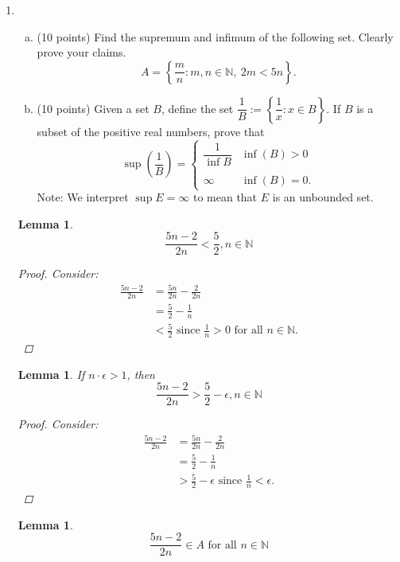 \documentclass{amsart}
\newtheorem{lemma}[theorem]{Lemma}
\begin{document}
\begin{enumerate}[1.]
\item  \begin{enumerate}[(a)]
	\item (10 points) Find the supremum and infimum of the following set.
	Clearly prove your claims.
	\[ A = \left\{ \frac{m}{n} : m,n \in \mathbb N,\ 2m<5n \right\}. \]
	\item (10 points) Given a set $B$, define the set $\dfrac{1}{B} := \left\{\dfrac{1}{x} : x \in B \right\}$. If $B$ is a subset of the positive real numbers, prove that
	\[ \sup \left(\frac{1}{B} \right) = \begin{cases}
                                            \dfrac{1}{\inf B} & \inf(B) > 0 \\
	                                                          & \\
	                                        \infty            & \inf(B) = 0.
	\end{cases}
	\]
Note: We interpret $\sup E = \infty$ to mean that $E$ is an unbounded set.
\end{enumerate}
\begin{lemma}
	\[
		\frac{5n - 2}{2n} < \frac{5}{2}, n \in \mathbb{N}	
	\]
	\begin{proof}
		Consider:
		\begin{align*}
			\frac{5n - 2}{2n} &= \frac{5n}{2n} - \frac{2}{2n} \\
			&= \frac{5}{2} - \frac{1}{n} \\
			&< \frac{5}{2} \text { since } \frac{1}{n} > 0 \text{ for all } n\in \mathbb{N}.
		\end{align*}
	\end{proof}
\end{lemma}
\begin{lemma}
	If $n\cdot \epsilon > 1$, then
	\[
		\frac{5n - 2}{2n} > \frac{5}{2} - \epsilon, n \in \mathbb{N}	
	\]
	\begin{proof}
		Consider:
		\begin{align*}
			\frac{5n - 2}{2n} &= \frac{5n}{2n} - \frac{2}{2n} \\
			&= \frac{5}{2} - \frac{1}{n} \\
			&> \frac{5}{2} - \epsilon \text { since } \frac{1}{n} < \epsilon.
		\end{align*}
	\end{proof}
\end{lemma}
\begin{lemma}
	\[
		\frac{5n - 2}{2n} \in A \text{ for all } n \in \mathbb{N}
\]
\end{lemma}
\end{enumerate}
\end{document}
